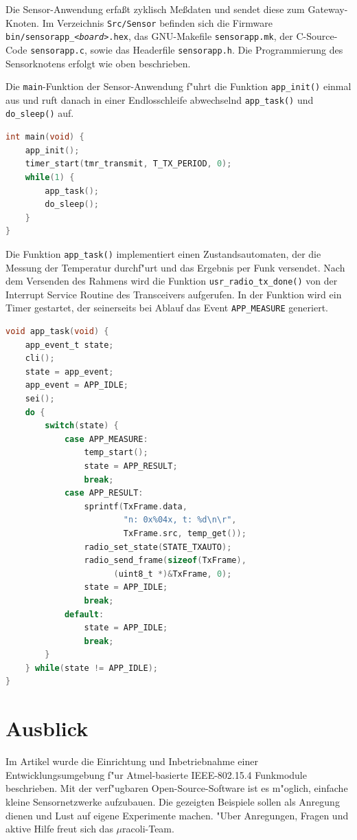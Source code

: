 \documentclass{clt2011}
\begin{document}
Die Sensor-Anwendung erfa\ss{}t zyklisch Me\ss{}daten und sendet diese zum
Gateway-Knoten. Im Verzeichnis \texttt{Src/Sensor} befinden sich
die Firmware \texttt{bin/sensorapp\_{\em<board>}.hex}, das GNU-Makefile
\texttt{sensorapp.mk}, der C-Source-Code \texttt{sensorapp.c}, sowie das Headerfile 
\texttt{sensorapp.h}. Die Programmierung des Sensorknotens erfolgt wie oben beschrieben.

Die \texttt{main}-Funktion der Sensor-Anwendung f"uhrt die Funktion \texttt{app\_init()}
einmal aus und ruft danach in einer Endlosschleife abwechselnd \texttt{app\_task()}
und \texttt{do\_sleep()} auf.
\begin{lstlisting}[language=C]
int main(void) {
    app_init();
    timer_start(tmr_transmit, T_TX_PERIOD, 0);
    while(1) {
        app_task();
        do_sleep();
    }
}
\end{lstlisting}

Die Funktion \texttt{app\_task()} implementiert einen Zustandsautomaten, der
die Messung der Temperatur durchf"urt und das Ergebnis per Funk versendet.
Nach dem Versenden des Rahmens wird die Funktion \texttt{usr\_radio\_tx\_done()} von
der Interrupt Service Routine des Transceivers aufgerufen. In der Funktion
wird ein Timer gestartet, der seinerseits bei Ablauf das Event \texttt{APP\_MEASURE}
generiert.

\begin{lstlisting}[language=C]
void app_task(void) {
    app_event_t state;
    cli();
    state = app_event;
    app_event = APP_IDLE;
    sei();
    do {
        switch(state) {
            case APP_MEASURE:
                temp_start();
                state = APP_RESULT;
                break;
            case APP_RESULT:
                sprintf(TxFrame.data,
                        "n: 0x%04x, t: %d\n\r",
                        TxFrame.src, temp_get());
                radio_set_state(STATE_TXAUTO);
                radio_send_frame(sizeof(TxFrame),
                      (uint8_t *)&TxFrame, 0);
                state = APP_IDLE;
                break;
            default:
                state = APP_IDLE;
                break;
        }
    } while(state != APP_IDLE);
}
\end{lstlisting}


\section{Ausblick}
Im Artikel wurde die Einrichtung und Inbetriebnahme einer Entwicklungsumgebung
f"ur \textsf{Atmel}-basierte IEEE-802.15.4 Funkmodule beschrieben. Mit der verf"ugbaren
Open-Source-Soft\-ware ist es m"oglich, einfache kleine Sensornetzwerke
aufzubauen. Die gezeigten Beispiele sollen als Anregung dienen und Lust auf
eigene Experimente machen. "Uber Anregungen, Fragen und aktive Hilfe freut
sich das $\mu{}$racoli-Team.
\end{document}

